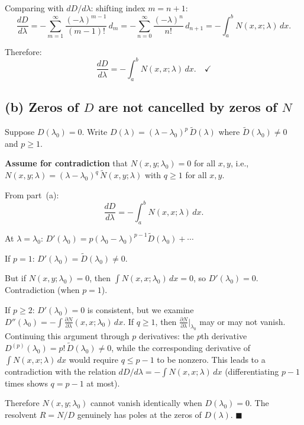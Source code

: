 \documentclass[12pt]{article}
\begin{document}
Comparing with $dD/d\lambda$: shifting index $m = n+1$:
\[
\frac{dD}{d\lambda} = -\sum_{m=1}^{\infty} \frac{(-\lambda)^{m-1}}{(m-1)!}\,d_m = -\sum_{n=0}^{\infty}\frac{(-\lambda)^n}{n!}\,d_{n+1} = -\int_a^b N(x,x;\lambda)\,dx.
\]

Therefore:
\[
\boxed{\frac{dD}{d\lambda} = -\int_a^b N(x,x;\lambda)\,dx}. \quad \checkmark
\]

\subsection*{(b) Zeros of $D$ are not cancelled by zeros of $N$}

Suppose $D(\lambda_0) = 0$. Write $D(\lambda) = (\lambda - \lambda_0)^p\,\tilde{D}(\lambda)$ where $\tilde{D}(\lambda_0) \neq 0$ and $p \ge 1$.

\textbf{Assume for contradiction} that $N(x,y;\lambda_0) = 0$ for all $x,y$, i.e., $N(x,y;\lambda) = (\lambda - \lambda_0)^q\,\tilde{N}(x,y;\lambda)$ with $q \ge 1$ for all $x,y$.

From part~(a):
\[
\frac{dD}{d\lambda} = -\int_a^b N(x,x;\lambda)\,dx.
\]

At $\lambda = \lambda_0$: $D'(\lambda_0) = p(\lambda_0 - \lambda_0)^{p-1}\tilde{D}(\lambda_0) + \cdots$

If $p = 1$: $D'(\lambda_0) = \tilde{D}(\lambda_0) \neq 0$.

But if $N(x,y;\lambda_0) = 0$, then $\int N(x,x;\lambda_0)\,dx = 0$, so $D'(\lambda_0) = 0$. Contradiction (when $p = 1$).

If $p \ge 2$: $D'(\lambda_0) = 0$ is consistent, but we examine $D''(\lambda_0) = -\int \frac{\partial N}{\partial\lambda}(x,x;\lambda_0)\,dx$. If $q \ge 1$, then $\frac{\partial N}{\partial \lambda}\big|_{\lambda_0}$ may or may not vanish. Continuing this argument through $p$ derivatives: the $p$th derivative $D^{(p)}(\lambda_0) = p!\,\tilde{D}(\lambda_0) \neq 0$, while the corresponding derivative of $\int N(x,x;\lambda)\,dx$ would require $q \le p-1$ to be nonzero. This leads to a contradiction with the relation $dD/d\lambda = -\int N(x,x;\lambda)\,dx$ (differentiating $p-1$ times shows $q = p - 1$ at most).

Therefore $N(x,y;\lambda_0)$ cannot vanish identically when $D(\lambda_0) = 0$. The resolvent $R = N/D$ genuinely has poles at the zeros of $D(\lambda)$. \hfill $\blacksquare$
\end{document}
